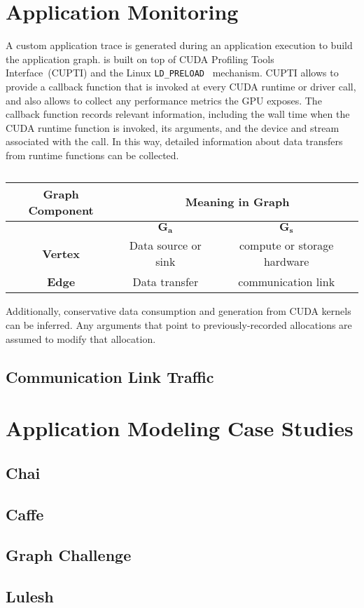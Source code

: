 \section{Application Monitoring}



A custom application trace is generated during an application execution to build the application graph.
 is built on top of CUDA Profiling Tools Interface~\cite{nvidia2017cupti}(CUPTI) and the Linux \texttt{LD\_PRELOAD}~\cite{kerrisk2017ld} mechanism.
CUPTI allows  to provide a callback function that is invoked at every CUDA runtime or driver call, and also allows  to collect any performance metrics the GPU exposes.
The callback function records relevant information, including the wall time when the CUDA runtime function is invoked, its arguments, and the device and stream associated with the call.
In this way, detailed information about data transfers from runtime functions can be collected.

\begin{table}[h]
    \centering
    \caption{}
    \label{tab:graph-comparison}
    \begin{tabular}{|c|c|c|}
    \hline
    \textbf{Graph Component} & \multicolumn{2}{|c|}{\textbf{Meaning in Graph}}   \\ \hline
                             & $\bm{G_a}$    & $\bm{G_s}$                        \\ \hline \hline
    \textbf{Vertex}          & Data source or sink & compute or storage hardware \\ \hline
    \textbf{Edge}            & Data transfer & communication link                \\ \hline
    \end{tabular}
\end{table}

Additionally, conservative data consumption and generation from CUDA kernels can be inferred.
Any arguments that point to previously-recorded allocations are assumed to modify that allocation.



\subsection{Communication Link Traffic}



\section{Application Modeling Case Studies}
\subsection{Chai}
\subsection{Caffe}
\subsection{Graph Challenge}
\subsection{Lulesh}